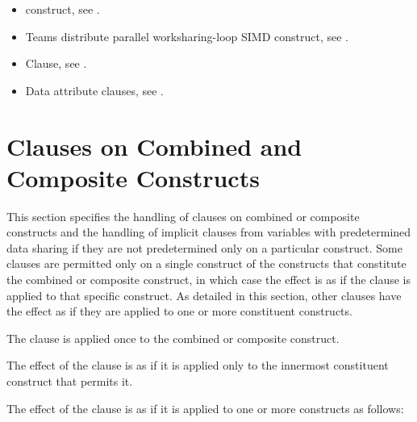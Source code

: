 \crossreferences
\begin{itemize}
\item {} construct, see .

\item Teams distribute parallel worksharing-loop SIMD construct, see
.

\item {} Clause, see .

\item Data attribute clauses, see
.
\end{itemize}



\section{Clauses on Combined and Composite Constructs}
\label{sec:Clauses on Combined and Composite Constructs}
This section specifies the handling of clauses on combined or composite constructs 
and the handling of implicit clauses from variables with predetermined data sharing 
if they are not predetermined only on a particular construct. Some clauses are 
permitted only on a single construct of the constructs that constitute the 
combined or composite construct, in which case the effect is as if the 
clause is applied to that specific construct. As detailed in this section, other 
clauses have the effect as if they are applied to one or more constituent constructs.

The  clause is applied once to the combined or composite construct.

The effect of the  clause is as if it is applied only to the innermost 
constituent construct that permits it.

The effect of the  clause is as if it is applied to one or 
more constructs as follows:

